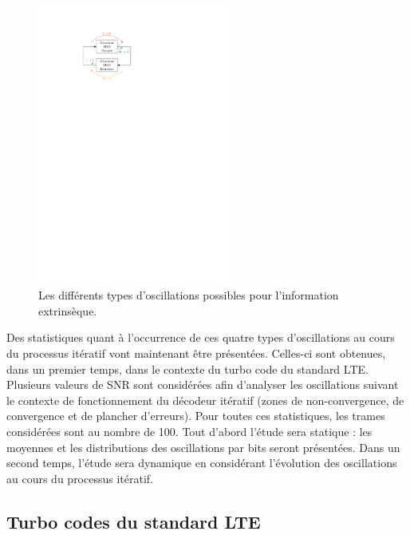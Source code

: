 \begin{figure}[tb]
	\centering
	\includegraphics[width=6.5cm]{main/ch2_fig/ipe/osc.pdf}
	\caption{\label{fig:osc}Les différents types d'oscillations possibles pour l'information extrinsèque.}
\end{figure}

Des statistiques quant à l’occurrence de ces quatre types d'oscillations au cours du processus itératif vont maintenant être 
présentées. Celles-ci sont obtenues, dans un premier temps, dans le contexte du turbo code du standard LTE.
Plusieurs valeurs de SNR sont considérées afin d'analyser les oscillations suivant le contexte de fonctionnement du 
décodeur itératif (zones de non-convergence, de convergence et de plancher d'erreurs). Pour toutes ces statistiques, les 
trames considérées sont au nombre de 100. Tout d'abord l'étude sera statique : les moyennes et les distributions des 
oscillations par bits seront présentées. Dans un second temps, l'étude sera dynamique en considérant l'évolution des 
oscillations au cours du processus itératif.

\subsection{Turbo codes du standard LTE}
